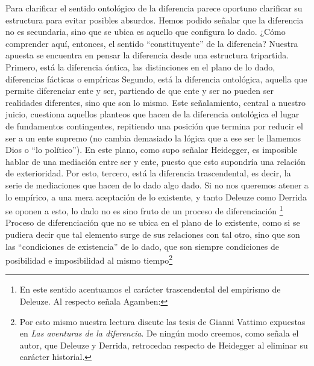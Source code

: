 Para clarificar el sentido ontológico de la diferencia parece oportuno clarificar su estructura para evitar posibles absurdos. Hemos podido señalar que la diferencia no es secundaria, sino que se ubica es aquello que configura lo dado. ¿Cómo comprender aquí, entonces, el sentido \enquote{constituyente} de la diferencia? Nuestra apuesta se encuentra en pensar la diferencia desde una estructura tripartida. Primero, está la diferencia óntica, las distinciones en el plano de lo dado, diferencias fácticas o empíricas Segundo, está la diferencia ontológica, aquella que permite diferenciar ente y ser, partiendo de que ente y ser no pueden ser realidades diferentes, sino que son lo mismo. Este señalamiento, central a nuestro juicio, cuestiona aquellos planteos que hacen de la diferencia ontológica el lugar de fundamentos contingentes, repitiendo una posición que termina por reducir el ser a un ente supremo (no cambia demasiado la lógica que a ese ser le llamemos Dios o \enquote{lo político}). En este plano, como supo señalar Heidegger, es imposible hablar de una mediación entre ser y ente, puesto que esto supondría una relación de exterioridad. Por esto, tercero, está la diferencia trascendental, es decir, la serie de mediaciones que hacen de lo dado algo dado. Si no nos queremos atener a lo empírico, a una mera aceptación de lo existente, y tanto Deleuze como Derrida se oponen a esto, lo dado no es sino fruto de un proceso de diferenciación \footnote{En este sentido acentuamos el carácter trascendental del empirismo de Deleuze. Al respecto señala Agamben:} \cite[\enquote{(...) con Deleuze lo trascendental se aparta decididamente de toda idea de conciencia para presentarse como una experiencia sin conciencia ni sujeto: un empirismo trascendental}.]{@6987-AGAMBEN2008} Proceso de diferenciación que no se ubica en el plano de lo existente, como si se pudiera decir que tal elemento surge de sus relaciones con tal otro, sino que son las \enquote{condiciones de existencia} de lo dado, que son siempre condiciones de posibilidad e imposibilidad al mismo tiempo\footnote{Por esto mismo nuestra lectura discute las tesis de Gianni Vattimo expuestas en \emph{Las aventuras de la diferencia}. De ningún modo creemos, como señala el autor, que Deleuze y Derrida, retrocedan respecto de Heidegger al eliminar su carácter historial.\cite{@6988-VATTINO1999}}

